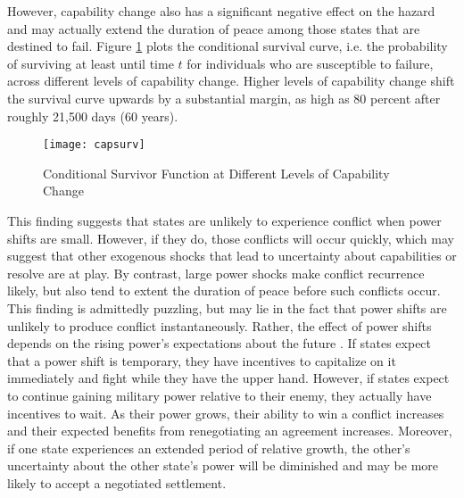 \documentclass[letterpaper, 12pt]{article}
\let\originaltable\table
\let\endoriginaltable\endtable
\renewenvironment{table}[1][ht]{%
	\originaltable[#1]
	\centering}%
{\endoriginaltable}
\theoremstyle{plain}
\begin{document}
However, capability change also has a significant negative effect on the hazard and may actually extend the duration of peace among those states that are destined to fail. Figure \ref{fig:lhr.cap.surv} plots the conditional survival curve, i.e. the probability of surviving at least until time $t$ for individuals who are susceptible to failure, across different levels of capability change. Higher levels of capability change shift the survival curve upwards by a substantial margin, as high as 80 percent after roughly 21,500 days (60 years). 

\begin{figure}[htbp]\centering
	\caption{Conditional Survivor Function at Different Levels of Capability Change}
	\texttt{[image: capsurv]}
	\label{fig:lhr.cap.surv}
\end{figure}

This finding suggests that states are unlikely to experience conflict when power shifts are small. However, if they do, those conflicts will occur quickly, which may suggest that other exogenous shocks that lead to uncertainty about capabilities or resolve are at play. By contrast, large power shocks make conflict recurrence likely, but also tend to extent the duration of peace before such conflicts occur. This finding is admittedly puzzling, but may lie in the fact that power shifts are unlikely to produce conflict instantaneously. Rather, the effect of power shifts depends on the rising power's expectations about the future \citep{bas2017}. If states expect that a power shift is temporary, they have incentives to capitalize on it immediately and fight while they have the upper hand. However, if states expect to continue gaining military power relative to their enemy, they actually have incentives to wait. As their power grows, their ability to win a conflict increases and their expected benefits from renegotiating an agreement increases. Moreover, if one state experiences an extended period of relative growth, the other's uncertainty about the other state's power will be diminished and may be more likely to accept a negotiated settlement.

\begin{comment}
\begin{table}[ht]
	\centering
	\begin{tabular}{rlrrrr}
		\hline
		& Parameter & Estimate & Std. Error & t value & Pr($>$$|$t$|$) \\ 
		\hline
		1 & Dur\_(Intercept) & 4.00 & 0.24 & 16.84 & 0.00 \\ 
		2 & Dur\_polity2 & 0.21 & 0.03 & 6.78 & 0.00 \\ 
		3 & log(alpha) & -0.03 & 0.12 & -0.27 & 0.79 \\ 
		4 & Risk\_(Intercept) & 6.53 & 3.26 & 2.01 & 0.04 \\ 
		5 & Risk\_polity2 & 0.90 & 0.41 & 2.20 & 0.03 \\ 
		\hline
	\end{tabular}
\end{table}
\end{comment}
\end{document}
